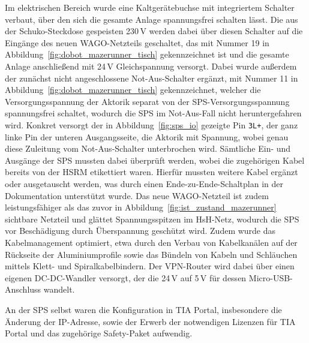 Im elektrischen Bereich wurde eine Kaltgerätebuchse mit integriertem Schalter verbaut, über den sich die gesamte Anlage spannungsfrei schalten lässt.
Die aus der Schuko-Steckdose gespeisten 230\,V werden dabei über diesen Schalter auf die Eingänge des neuen WAGO-Netzteils geschaltet, das mit Nummer 19 in Abbildung~\ref{fig:dobot_mazerunner_tisch} gekennzeichnet ist und die gesamte Anlage anschließend mit 24\,V Gleichspannung versorgt.
Dabei wurde außerdem der zunächst nicht angeschlossene Not-Aus-Schalter ergänzt, mit Nummer 11 in Abbildung~\ref{fig:dobot_mazerunner_tisch} gekennzeichnet, welcher die Versorgungsspannung der Aktorik separat von der SPS-Versorgungsspannung spannungsfrei schaltet, wodurch die SPS im Not-Aus-Fall nicht heruntergefahren wird.
Konkret versorgt der in Abbildung~\ref{fig:sps_io} gezeigte Pin \texttt{3L+}, der ganz linke Pin der unteren Ausgangsseite, die Aktorik mit Spannung, wobei genau diese Zuleitung vom Not-Aus-Schalter unterbrochen wird.
Sämtliche Ein- und Ausgänge der SPS mussten dabei überprüft werden, wobei die zugehörigen Kabel bereits von der HSRM etikettiert waren.
Hierfür mussten weitere Kabel ergänzt oder ausgetauscht werden, was durch einen Ende-zu-Ende-Schaltplan in der Dokumentation unterstützt wurde.
Das neue WAGO-Netzteil ist zudem leistungsfähiger als das zuvor in Abbildung~\ref{fig:ist_zustand_mazerunner} sichtbare Netzteil und glättet Spannungsspitzen im HsH-Netz, wodurch die SPS vor Beschädigung durch Überspannung geschützt wird.
Zudem wurde das Kabelmanagement optimiert, etwa durch den Verbau von Kabelkanälen auf der Rückseite der Aluminiumprofile sowie das Bündeln von Kabeln und Schläuchen mittels Klett- und Spiralkabelbindern.
Der VPN-Router wird dabei über einen eigenen DC-DC-Wandler versorgt, der die 24\,V auf 5\,V für dessen Micro-USB-Anschluss wandelt.

An der SPS selbst waren die Konfiguration in TIA Portal, insbesondere die Änderung der IP-Adresse, sowie der Erwerb der notwendigen Lizenzen für TIA Portal und das zugehörige Safety-Paket aufwendig.

